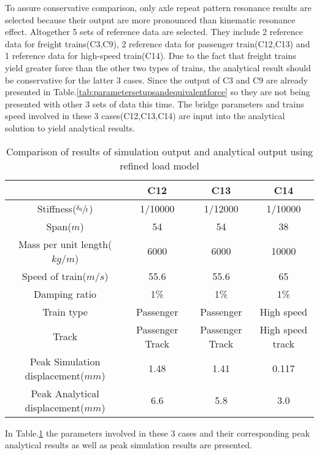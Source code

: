 To assure conservative comparison, only axle repeat pattern resonance results are selected because their output are more pronounced than kinematic resonance effect. Altogether 5 sets of reference data are selected. They include 2 reference data for freight trains(C3,C9), 2 reference data for passenger train(C12,C13) and 1 reference data for high-speed train(C14). Due to the fact that freight trains yield greater force than the other two types of trains, the analytical result should be conservative for the latter 3 cases. Since the output of C3 and C9 are already presented in Table.\ref{tab:parametersetupsandequivalentforce} so they are not being presented with other 3 sets of data this time. The bridge parameters and trains speed involved in these 3 cases(C12,C13,C14) are input into the analytical solution to yield analytical results.

\begin{table}[h!]
    \centering
    \caption{Comparison of results of simulation output and analytical output using refined load model}
    \begin{tabular}{c|ccc}
        \hline
         & C12 & C13 & C14\\
        \hline
        Stiffness($\sfrac{\delta_0}{t}$) & 1/10000 & 1/12000 & 1/10000\\
        Span($m$) & 54 & 54 & 38\\
        Mass per unit length($kg/m$) & 6000 & 6000 & 10000\\
        Speed of train($m/s$) & 55.6 & 55.6 & 65\\
        Damping ratio & 1\% & 1\% & 1\%\\
        Train type & Passenger & Passenger & High speed \\
        Track & Passenger Track & Passenger Track & High speed track\\
        \hline
        Peak Simulation displacement($mm$) & 1.48 & 1.41 & 0.117\\
        Peak Analytical displacement($mm$) & 6.6 & 5.8 & 3.0 \\
        \hline
    \end{tabular}
    \label{tab:comparisonresultssimulationanalytical}
\end{table}


In Table.\ref{tab:comparisonresultssimulationanalytical} the parameters involved in these 3 cases and their corresponding peak analytical results as well as peak simulation results are presented. 



